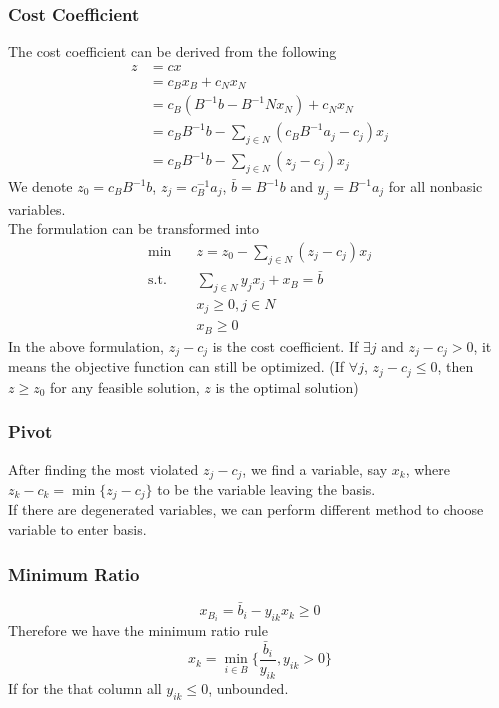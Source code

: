 				\subsubsection{Cost Coefficient}
					The cost coefficient can be derived from the following
					\begin{align}
						z &= cx \\
						  &= c_Bx_B + c_Nx_N \\
						  &= c_B(B^{-1}b - B^{-1}Nx_N) + c_Nx_N\\
						  &= c_BB^{-1}b - \sum_{j\in N}(c_BB^{-1}a_j - c_j)x_j \\
						  &= c_BB^{-1}b - \sum_{j\in N}(z_j-c_j)x_j 
 					\end{align}
 					We denote $z_0 = c_BB^{-1}b$, $z_j = c_B^{-1}a_j$, $\bar{b} = B^{-1}b$ and $y_j = B^{-1}a_j$ for all nonbasic variables.\\
 					The formulation can be transformed into
 					\begin{align}
 						\min \quad & z = z_0 - \sum_{j\in N}(z_j - c_j)x_j\\
 						\text{s.t.} \quad & \sum_{j\in N}y_jx_j + x_B = \bar{b} \\
 										  & x_j \ge 0, j\in N \\
 										  & x_B \ge 0 
 					\end{align}
 					In the above formulation, $z_j - c_j$ is the cost coefficient. If $\exists j$ and $z_j - c_j > 0$, it means the objective function can still be optimized. (If $\forall j$, $z_j - c_j \le 0$, then $z \ge z_0$ for any feasible solution, $z$ is the optimal solution)

 				\subsubsection{Pivot}
 					After finding the most violated $z_j - c_j$, we find a variable, say $x_k$, where $z_k - c_k = \min \{z_j - c_j\}$ to be the variable leaving the basis. \\
 					If there are degenerated variables, we can perform different method to choose variable to enter basis.

 				\subsubsection{Minimum Ratio}
 					\begin{equation}
 						x_{B_i} = \bar{b}_i - y_{ik}x_k \ge 0 
 					\end{equation}
 					Therefore we have the minimum ratio rule
 					\begin{equation}
 						x_k = \min_{i \in B} \{\frac{\bar{b}_i}{y_{ik}}, y_{ik} > 0\} 
 					\end{equation}
 					If for the that column all $y_{ik} \le 0$, unbounded.

